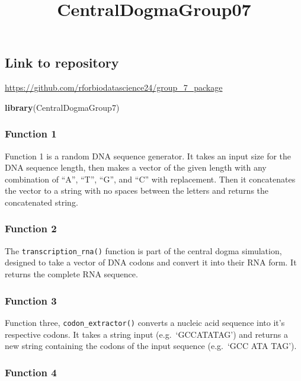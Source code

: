 \documentclass[
]{article}
\title{CentralDogmaGroup07}
\author{}
\date{\vspace{-2.5em}}
\newenvironment{Shaded}{\begin{snugshade}}{\end{snugshade}}
\newcommand{\FunctionTok}[1]{\textcolor[rgb]{0.13,0.29,0.53}{\textbf{#1}}}
\newcommand{\NormalTok}[1]{#1}
\begin{document}
\maketitle

\subsection{Link to repository}\label{link-to-repository}

\url{https://github.com/rforbiodatascience24/group_7_package}

\begin{Shaded}
\begin{Highlighting}[]
\FunctionTok{library}\NormalTok{(CentralDogmaGroup7)}
\end{Highlighting}
\end{Shaded}

\subsubsection{Function 1}\label{function-1}

Function 1 is a random DNA sequence generator. It takes an input size
for the DNA sequence length, then makes a vector of the given length
with any combination of ``A'', ``T'', ``G'', and ``C'' with replacement.
Then it concatenates the vector to a string with no spaces between the
letters and returns the concatenated string.

\subsubsection{Function 2}\label{function-2}

The \texttt{transcription\_rna()} function is part of the central dogma
simulation, designed to take a vector of DNA codons and convert it into
their RNA form. It returns the complete RNA sequence.

\subsubsection{Function 3}\label{function-3}

Function three, \texttt{codon\_extractor()} converts a nucleic acid
sequence into it's respective codons. It takes a string input
(e.g.~`GCCATATAG') and returns a new string containing the codons of the
input sequence (e.g.~`GCC ATA TAG').

\subsubsection{Function 4}\label{function-4}
\end{document}
